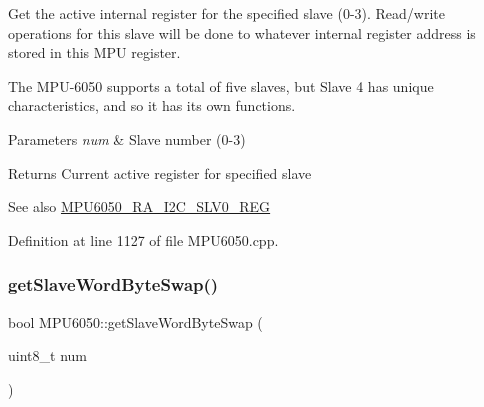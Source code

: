 Get the active internal register for the specified slave (0-\/3). Read/write operations for this slave will be done to whatever internal register address is stored in this M\+PU register.

The M\+P\+U-\/6050 supports a total of five slaves, but Slave 4 has unique characteristics, and so it has its own functions.


\begin{DoxyParams}{Parameters}
{\em num} & Slave number (0-\/3) \\
\hline
\end{DoxyParams}
\begin{DoxyReturn}{Returns}
Current active register for specified slave 
\end{DoxyReturn}
\begin{DoxySeeAlso}{See also}
\mbox{\hyperlink{MPU6050_8h_ae9fc1bc0eb0c568846328de91127ca80}{M\+P\+U6050\+\_\+\+R\+A\+\_\+\+I2\+C\+\_\+\+S\+L\+V0\+\_\+\+R\+EG}} 
\end{DoxySeeAlso}


Definition at line 1127 of file M\+P\+U6050.\+cpp.


\begin{DoxyCode}{0}

\end{DoxyCode}
\mbox{\label{classMPU6050_a18e8f3d053a68f0e5ecf497c87ecac8a}} 
\subsubsection{\texorpdfstring{getSlaveWordByteSwap()}{getSlaveWordByteSwap()}}
{\footnotesize\ttfamily bool M\+P\+U6050\+::get\+Slave\+Word\+Byte\+Swap (\begin{DoxyParamCaption}\item[{uint8\+\_\+t}]{num }\end{DoxyParamCaption})}

